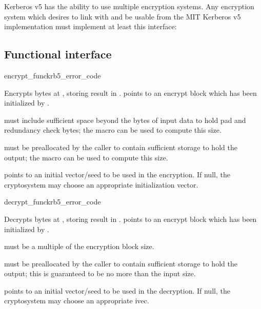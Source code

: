 Kerberos v5 has the ability to use multiple encryption systems.  Any
encryption system which desires to link with and be usable from the MIT
Kerberos v5 implementation must implement at least this interface:

\subsection{Functional interface}

\begin{funcdecl}{encrypt_func}{krb5_error_code}{\funcvoid}
\end{funcdecl}
Encrypts  bytes at , storing result in
.   points to an encrypt block which
has been initialized by .

 must include sufficient space beyond the 
bytes of input data to hold pad and redundancy check bytes; the macro
 can be used to compute this size.

 must be preallocated by the caller to contain sufficient
storage to hold the output; the macro  can
be used to compute this size.

 points to an initial vector/seed to be used in the encryption.
If null, the cryptosystem may choose an appropriate initialization vector.


\begin{funcdecl}{decrypt_func}{krb5_error_code}{\funcvoid}
\end{funcdecl}
Decrypts  bytes at , storing result in
.
 points to an encrypt block which has been initialized
by .

 must be a multiple of the encryption block size.

 must be preallocated by the caller to contain sufficient
storage to hold the output; this is guaranteed to be no more than
the input size.

 points to an initial vector/seed to be used in the decryption.
If null, the cryptosystem may choose an appropriate ivec.

